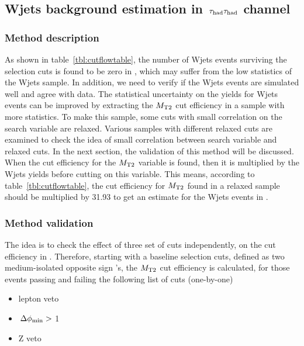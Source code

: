 \subsection{\texorpdfstring{Wjets background estimation in $\,\tau_{\rm had}\tau_{\rm had}$ channel}{Wjets background estimation in tau-tau channel}}
\subsubsection{Method description}

As shown in table~\ref{tbl:cutflowtable}, the number of Wjets events surviving 
the selection cuts is found to be zero in \binone, which may suffer from the low statistics of the Wjets sample. In addition, we need to verify if the Wjets events are simulated well and agree with data.
 The statistical uncertainty on the yields for Wjets events can be improved by extracting 
the ${M_{\rm T2}}$ cut efficiency in a sample with more statistics. To make this sample, some cuts with small correlation on the search variable are 
relaxed. Various samples with different relaxed cuts are examined to check the idea of small correlation 
between search variable and relaxed cuts. In the next section, the validation of this method will be discussed.\\
When the cut efficiency for the ${M_{\rm T2}}$ variable is found, then it is multiplied by the Wjets 
yields before cutting on this variable. This means, according to table~\ref{tbl:cutflowtable}, the cut efficiency for 
${M_{\rm T2}}$ found in a relaxed sample should be multiplied by 31.93 to get an 
estimate for the Wjets events in  \binone.\\

\subsubsection{Method validation}
The idea is to check the effect of three set of cuts independently, 
on the \mttwo cut efficiency in  \binone. 
Therefore, starting with a baseline selection cuts, defined as two 
medium-isolated opposite sign \Tau's, the ${M_{\rm T2}}$ cut 
efficiency is calculated, for those events passing and failing the following list of cuts (one-by-one)
\begin{itemize}
\item lepton veto
\item $\,{\Delta\phi_{\rm min}}>$ 1
\item Z veto 
\end{itemize}

